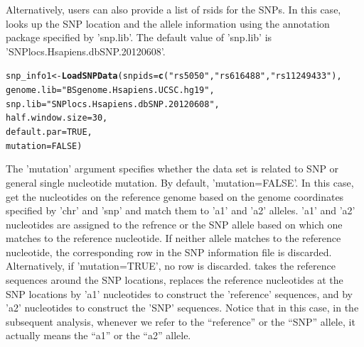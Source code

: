 \documentclass[a4paper,10pt]{article}\usepackage[]{graphicx}\usepackage[]{color}
\makeatletter
\newcommand{\hlnum}[1]{\textcolor[rgb]{0.686,0.059,0.569}{#1}}%
\newcommand{\hlstr}[1]{\textcolor[rgb]{0.192,0.494,0.8}{#1}}%
\newcommand{\hlstd}[1]{\textcolor[rgb]{0.345,0.345,0.345}{#1}}%
\newcommand{\hlkwb}[1]{\textcolor[rgb]{0.69,0.353,0.396}{#1}}%
\newcommand{\hlkwc}[1]{\textcolor[rgb]{0.333,0.667,0.333}{#1}}%
\newcommand{\hlkwd}[1]{\textcolor[rgb]{0.737,0.353,0.396}{\textbf{#1}}}%
\newenvironment{kframe}{%
 \def\at@end@of@kframe{}%
 \ifinner\ifhmode%
  \def\at@end@of@kframe{\end{minipage}}%
  \begin{minipage}{\columnwidth}%
 \fi\fi%
 \def\FrameCommand##1{\hskip\@totalleftmargin \hskip-\fboxsep
 \colorbox{shadecolor}{##1}\hskip-\fboxsep
     \hskip-\linewidth \hskip-\@totalleftmargin \hskip\columnwidth}%
 \MakeFramed {\advance\hsize-\width
   \@totalleftmargin\z@ \linewidth\hsize
   \@setminipage}}%
 {\par\unskip\endMakeFramed%
 \at@end@of@kframe}
\newenvironment{knitrout}{}{} %
\makeatother
\begin{document}
Alternatively, users can also provide a list of rsids for the SNPs. In this case,  looks up the SNP location and the allele information using the annotation package specified by 'snp.lib'. The default value of 'snp.lib' is 'SNPlocs.Hsapiens.dbSNP.20120608'.

\begin{knitrout}
\color{fgcolor}\begin{kframe}
\begin{alltt}
\hlstd{snp_info1} \hlkwb{<-} \hlkwd{LoadSNPData}\hlstd{(}\hlkwc{snpids} \hlstd{=} \hlkwd{c}\hlstd{(}\hlstr{"rs5050"}\hlstd{,} \hlstr{"rs616488"}\hlstd{,} \hlstr{"rs11249433"}\hlstd{),}
                         \hlkwc{genome.lib} \hlstd{=} \hlstr{"BSgenome.Hsapiens.UCSC.hg19"}\hlstd{,}
                         \hlkwc{snp.lib} \hlstd{=} \hlstr{"SNPlocs.Hsapiens.dbSNP.20120608"}\hlstd{,}
                         \hlkwc{half.window.size} \hlstd{=} \hlnum{30}\hlstd{,}
                         \hlkwc{default.par} \hlstd{=} \hlnum{TRUE}\hlstd{,}
                         \hlkwc{mutation} \hlstd{=} \hlnum{FALSE}\hlstd{)}
\end{alltt}
\end{kframe}
\end{knitrout}

The 'mutation' argument specifies whether the data set is related to SNP or general single nucleotide mutation. By default, 'mutation=FALSE'. In this case,  get the nucleotides on the reference genome based on the genome coordinates specified by 'chr' and 'snp' and match them to 'a1' and 'a2' alleles. 'a1' and 'a2' nucleotides are assigned to the refrence or the SNP allele based on which one matches to the reference nucleotide. If neither allele matches to the reference nucleotide, the corresponding row in the SNP information file is discarded. Alternatively, if 'mutation=TRUE', no row is discarded.  takes the reference sequences around the SNP locations, replaces the reference nucleotides at the SNP locations by 'a1' nucleotides to construct the 'reference' sequences, and by 'a2' nucleotides to construct the 'SNP' sequences. Notice that in this case, in the subsequent analysis, whenever we refer to the ``reference'' or the ``SNP'' allele, it actually means the ``a1'' or the ``a2'' allele.
\end{document}
